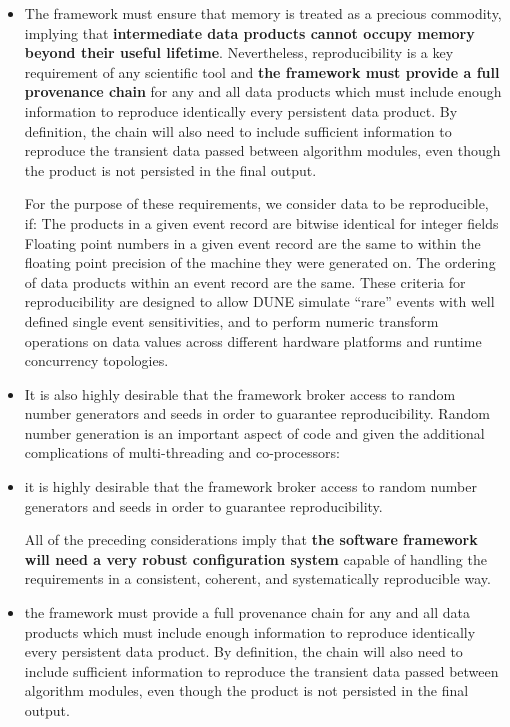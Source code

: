 \documentclass[../main-v1.tex]{subfiles}
\begin{document}
\begin{itemize}
\item The framework must ensure that memory is treated as a precious commodity, implying that {\bf intermediate data products cannot occupy memory beyond their useful lifetime}.  Nevertheless, reproducibility is a key requirement of any scientific tool and {\bf the framework must provide a full provenance chain} for any and all data products which must include enough information to reproduce identically every persistent data product. By definition, the chain will also need to include sufficient information to reproduce the transient data passed between algorithm modules, even though the product is not persisted in the final output.

 For the purpose of these requirements, we consider data to be reproducible, if:
The products in a given event record are bitwise identical for integer fields
Floating point numbers in a given event record are the same to within the floating point precision of the machine they were generated on.
The ordering of data products within an event record are the same.
These criteria for reproducibility are designed to allow DUNE simulate “rare” events with well defined single event sensitivities, and to perform numeric transform operations on data values across different hardware platforms and runtime concurrency topologies.

\item It is also highly desirable that the framework broker access to random number generators and seeds in order to guarantee reproducibility.  Random number generation is an important aspect of code and given the additional complications of multi-threading and co-processors:

\item it is highly desirable that the framework broker access to random number generators and seeds in order to guarantee reproducibility.  

All of the preceding considerations imply that {\bf the software framework will need a very robust configuration system} capable of handling the requirements in a consistent, coherent, and systematically reproducible way.

\item the framework must provide a full provenance chain for any and all data products which must include enough information to reproduce identically every persistent data product.  By definition, the chain will also need to include sufficient information to reproduce the transient data passed between algorithm modules, even though the product is not persisted in the final output.  
\end{itemize}
\end{document}
